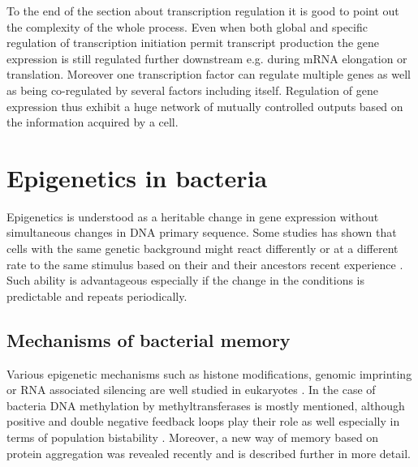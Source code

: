 To the end of the section about transcription regulation it is good to point out the complexity of the whole process.
Even when both global and specific regulation of transcription initiation permit transcript production the gene expression is still regulated further downstream e.g. during mRNA elongation or translation.
Moreover one transcription factor can regulate multiple genes as well as being co-regulated by several factors including itself.
Regulation of gene expression thus exhibit a huge network of mutually controlled outputs based on the information acquired by a cell.



\section{Epigenetics in bacteria}
Epigenetics is understood as a heritable change in gene expression without simultaneous changes in DNA primary sequence.
Some studies has shown that cells with the same genetic background might react differently or at a different rate to the same stimulus based on their and their ancestors recent experience \cite{mathis2017asymmetric, ronin2017long}.
Such ability is advantageous especially if the change in the conditions is predictable and repeats periodically.

\subsection{Mechanisms of bacterial memory}
Various epigenetic mechanisms such as histone modifications, genomic imprinting or RNA associated silencing are well studied in eukaryotes \cite{durso2014mechanisms}.
In the case of bacteria DNA methylation by methyltransferases is mostly mentioned, although positive and double negative feedback loops play their role as well especially in terms of population bistability \cite{casadesus2006epigenetic, casadesus2013programmed, adhikari2016dna}.
Moreover, a new way of memory based on protein aggregation was revealed recently \cite{govers2018protein} and is described further in more detail.

